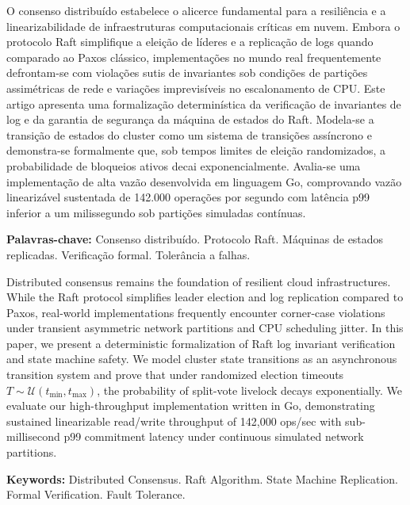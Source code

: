 \documentclass[
  article,
  12pt,
  oneside,
  a4paper,
  english,
  brazil
]{abntex2}
\begin{document}

\maketitle

\begin{resumoumacoluna}
O consenso distribuído estabelece o alicerce fundamental para a resiliência e a linearizabilidade de infraestruturas computacionais críticas em nuvem. Embora o protocolo Raft simplifique a eleição de líderes e a replicação de logs quando comparado ao Paxos clássico, implementações no mundo real frequentemente defrontam-se com violações sutis de invariantes sob condições de partições assimétricas de rede e variações imprevisíveis no escalonamento de CPU. Este artigo apresenta uma formalização determinística da verificação de invariantes de log e da garantia de segurança da máquina de estados do Raft. Modela-se a transição de estados do cluster como um sistema de transições assíncrono e demonstra-se formalmente que, sob tempos limites de eleição randomizados, a probabilidade de bloqueios ativos decai exponencialmente. Avalia-se uma implementação de alta vazão desenvolvida em linguagem Go, comprovando vazão linearizável sustentada de 142.000 operações por segundo com latência p99 inferior a um milissegundo sob partições simuladas contínuas.

\vspace{\onelineskip}
\noindent
\textbf{Palavras-chave:} Consenso distribuído. Protocolo Raft. Máquinas de estados replicadas. Verificação formal. Tolerância a falhas.
\end{resumoumacoluna}

\begin{resumoumacoluna}[Abstract]
Distributed consensus remains the foundation of resilient cloud infrastructures. While the Raft protocol simplifies leader election and log replication compared to Paxos, real-world implementations frequently encounter corner-case violations under transient asymmetric network partitions and CPU scheduling jitter. In this paper, we present a deterministic formalization of Raft log invariant verification and state machine safety. We model cluster state transitions as an asynchronous transition system and prove that under randomized election timeouts $T \sim \mathcal{U}(t_{\min}, t_{\max})$, the probability of split-vote livelock decays exponentially. We evaluate our high-throughput implementation written in Go, demonstrating sustained linearizable read/write throughput of 142,000 ops/sec with sub-millisecond p99 commitment latency under continuous simulated network partitions.

\vspace{\onelineskip}
\noindent
\textbf{Keywords:} Distributed Consensus. Raft Algorithm. State Machine Replication. Formal Verification. Fault Tolerance.
\end{resumoumacoluna}
\end{document}
